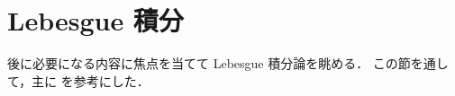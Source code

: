 \section{Lebesgue 積分}

後に必要になる内容に焦点を当てて Lebesgue 積分論を眺める．
この節を通して，主に \cite{Fo99,It63,mpmi} を参考にした．




